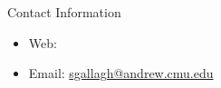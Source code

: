 \documentclass[final, 14pt]{beamer}
\newlength{\onecolwid}
\begin{document}
\begin{frame}[t]
\begin{columns}[t]
\begin{column}{\onecolwid}
\begin{alertblock}{Contact Information}

\begin{itemize}
\item Web: 
\item Email: \href{mailto:sgallagh@andrew.cmu.edu}{sgallagh@andrew.cmu.edu}
\end{itemize}

\end{alertblock}


\end{column} %

\end{columns} %

\end{frame} %
\end{document}

